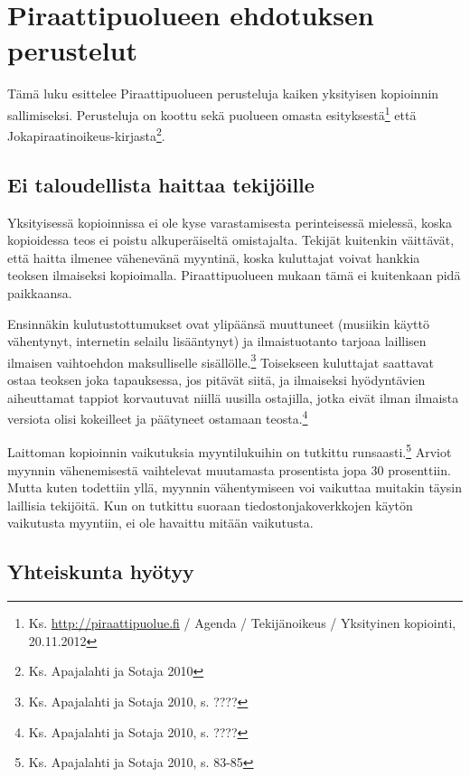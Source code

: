 \documentclass[titlepage,12pt]{article}
\begin{document}


\section{Piraattipuolueen ehdotuksen perustelut}

Tämä luku esittelee Piraattipuolueen perusteluja kaiken yksityisen
kopioinnin sallimiseksi.  Perusteluja on koottu sekä puolueen omasta
esityksestä\footnote{Ks. \url{http://piraattipuolue.fi} / Agenda /
  Tekijänoikeus / Yksityinen kopiointi, 20.11.2012} että
Jokapiraatin\-oikeus-kirjasta\footnote{Ks. Apajalahti ja Sotaja 2010}.

\subsection{Ei taloudellista haittaa tekijöille}

Yksityisessä kopioinnissa ei ole kyse varastamisesta perinteisessä
mielessä, koska kopioidessa teos ei poistu alkuperäiseltä omistajalta.
Tekijät kuitenkin väittävät, että haitta ilmenee vähenevänä myyntinä,
koska kuluttajat voivat hankkia teoksen ilmaiseksi kopioimalla.
Piraattipuolueen mukaan tämä ei kuitenkaan pidä paikkaansa.

Ensinnäkin kulutustottumukset ovat ylipäänsä muuttuneet (musiikin
käyttö vähentynyt, internetin selailu lisääntynyt) ja ilmaistuotanto
tarjoaa laillisen ilmaisen vaihtoehdon maksulliselle
sisällölle.\footnote{Ks. Apajalahti ja Sotaja 2010, s. ????}
Toisekseen kuluttajat saattavat ostaa teoksen joka tapauksessa, jos
pitävät siitä, ja ilmaiseksi hyödyntävien aiheuttamat tappiot
korvautuvat niillä uusilla ostajilla, jotka eivät ilman ilmaista
versiota olisi kokeilleet ja päätyneet ostamaan
teosta.\footnote{Ks. Apajalahti ja Sotaja 2010, s. ????}

Laittoman kopioinnin vaikutuksia myyntilukuihin on tutkittu
runsaasti.\footnote{Ks. Apajalahti ja Sotaja 2010, s. 83-85} Arviot
myynnin vähenemisestä vaihtelevat muutamasta prosentista jopa 30
prosenttiin.  Mutta kuten todettiin yllä, myynnin vähentymiseen voi
vaikuttaa muitakin täysin laillisia tekijöitä.  Kun on tutkittu
suoraan tiedostonjakoverkkojen käytön vaikutusta myyntiin, ei ole
havaittu mitään vaikutusta.%


\subsection{Yhteiskunta hyötyy}
\end{document}
